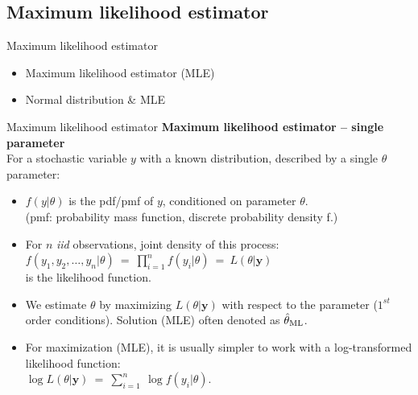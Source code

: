 \documentclass{beamer}
\begin{document}
\subsection{Maximum likelihood estimator}
\begin{frame}{Maximum likelihood estimator}
\begin{itemize}
    \item Maximum likelihood estimator (MLE)
    \bigskip
    \item Normal distribution \& MLE
\end{itemize}
\end{frame}
\begin{frame}{Maximum likelihood estimator}
\textbf{Maximum likelihood estimator -- single parameter}\\
\medskip
\small
For a stochastic variable $y$ with a known distribution, described by a single $\theta$ parameter:\\
\medskip
\begin{itemize}
\item $f(y|\theta)$ is the pdf/pmf of $y$, conditioned on parameter $\theta$. \\(pmf: probability mass function, discrete probability density f.)
\medskip
\item For $n$ \textit{iid} observations, joint density of this process: \\
$f(y_1,y_2,\dots,y_n|\theta)~=~\displaystyle\prod_{i=1}^n f(y_i|\theta)~=~L(\theta|\bm{y})$ \\is the likelihood function.\\
\medskip
\item We estimate $\theta$ by maximizing $L(\theta|\bm{y})$ with respect to the parameter ($1^{st}$ order conditions). Solution (MLE) often denoted as $\hat{\theta}_{\textnormal{ML}}$.
\medskip
\item For maximization (MLE), it is usually simpler to work with a log-transformed likelihood function:\\
$\log L(\theta|\bm{y})~=~\displaystyle\sum_{i=1}^n ~ \log f(y_i|\theta)$.
\end{itemize}
\end{frame}
\end{document}
